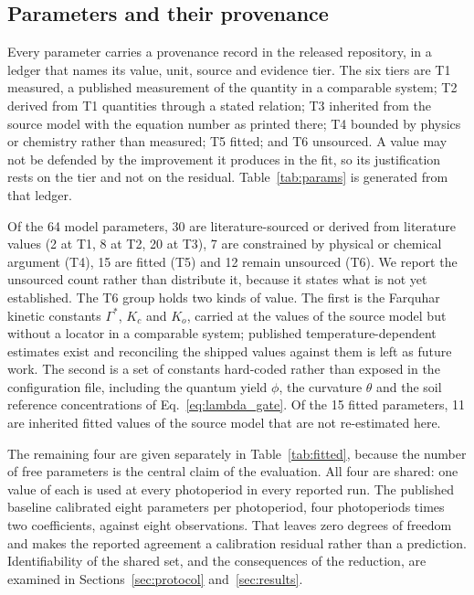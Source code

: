 \subsection{Parameters and their provenance}
\label{sec:params}

Every parameter carries a provenance record in the released repository, in a ledger
that names its value, unit, source and evidence tier. The six tiers are T1
measured, a published measurement of the quantity in a comparable system; T2
derived from T1 quantities through a stated relation; T3 inherited from the source
model with the equation number as printed there; T4 bounded by physics or chemistry
rather than measured; T5 fitted; and T6 unsourced. A value may not be defended by
the improvement it produces in the fit, so its justification rests on the tier and
not on the residual. Table~\ref{tab:params} is generated from that ledger.

Of the 64 model parameters, 30 are literature-sourced or derived from literature
values (2 at T1, 8 at T2, 20 at T3), 7 are constrained by physical or chemical
argument (T4), 15 are fitted (T5) and 12 remain unsourced (T6). We report the
unsourced count rather than distribute it, because it states what is not yet
established. The T6 group holds two kinds of value. The first is the Farquhar
kinetic constants $\Gamma^{*}$, $K_c$ and $K_o$, carried at the values of the
source model but without a locator in a comparable system; published
temperature-dependent estimates exist \citep{Bernacchi2001,Sharkey2007} and
reconciling the shipped values against them is left as future work. The second is a
set of constants hard-coded rather than exposed in the configuration file, including
the quantum yield $\phi$, the curvature $\theta$ and the soil reference
concentrations of Eq.~\eqref{eq:lambda_gate}. Of the 15 fitted parameters, 11 are
inherited fitted values of the source model that are not re-estimated here.

The remaining four are given separately in Table~\ref{tab:fitted}, because the
number of free parameters is the central claim of the evaluation. All four are
shared: one value of each is used at every photoperiod in every reported run. The
published baseline calibrated eight parameters per photoperiod, four photoperiods
times two coefficients, against eight observations. That leaves zero degrees of
freedom and makes the reported agreement a calibration residual rather than a
prediction. Identifiability of the shared set, and the consequences of the
reduction, are examined in Sections~\ref{sec:protocol} and~\ref{sec:results}.

